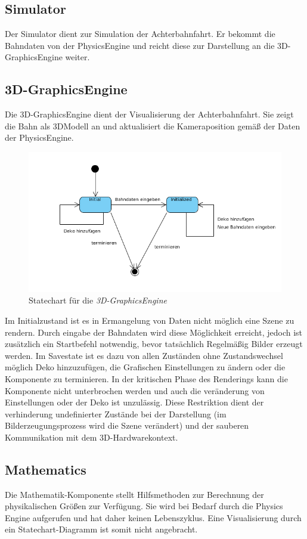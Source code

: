 \subsection{Simulator}
Der Simulator dient zur Simulation der Achterbahnfahrt. Er bekommt die Bahndaten von der PhysicsEngine und reicht diese zur Darstellung an die 3D-GraphicsEngine weiter.
\subsection{3D-GraphicsEngine}
Die 3D-GraphicsEngine dient der Visualisierung der Achterbahnfahrt. Sie zeigt die Bahn als 3DModell an und aktualisiert die Kameraposition gemäß der Daten der PhysicsEngine. 

\begin{figure}
\includegraphics[width=\linewidth]{bilder/statechart_3dgraphics}
\caption{Statechart für die \textit{3D-GraphicsEngine}}
\end{figure}

Im Initialzustand ist es in Ermangelung von Daten nicht möglich eine Szene zu rendern. Durch eingabe der Bahndaten wird diese Möglichkeit erreicht, jedoch ist zusätzlich ein Startbefehl notwendig,
bevor tatsächlich Regelmäßig Bilder erzeugt werden. Im Savestate ist es dazu von allen Zuständen ohne Zustandswechsel möglich Deko hinzuzufügen, die Grafischen Einstellungen zu ändern oder die Komponente zu terminieren.
In der kritischen Phase des Renderings kann die Komponente nicht unterbrochen werden und auch die veränderung von Einstellungen oder der Deko ist unzulässig. Diese Restriktion dient der verhinderung undefinierter
Zustände bei der Darstellung (im Bilderzeugungsprozess wird die Szene verändert)  und der sauberen Kommunikation mit dem 3D-Hardwarekontext.

\subsection{Mathematics}
Die Mathematik-Komponente stellt Hilfsmethoden zur Berechnung der physikalischen Größen zur Verfügung. Sie wird bei Bedarf durch die Physics Engine aufgerufen und hat daher keinen Lebenszyklus. Eine Visualisierung durch ein Statechart-Diagramm ist somit nicht angebracht.
